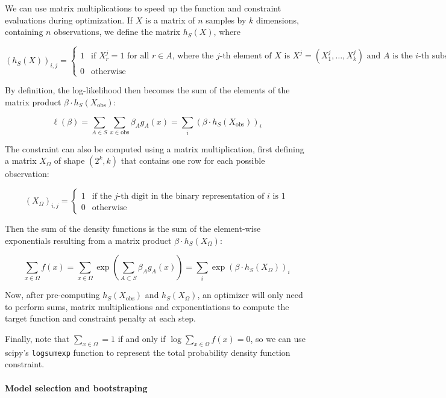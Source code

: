 We can use matrix multiplications to speed up the function and
constraint evaluations during optimization. If \(X\) is a matrix of
\(n\) samples by \(k\) dimensions, containing \(n\) observations, we
define the matrix \(h_S(X)\), where

\[ (h_S(X))_{i, j} = \begin{cases}
1 & \text{if } X_{r}^{j} = 1 \text{ for all } r \in A \text{, where the } j \text{-th element of } X \text{ is } X^{j} = (X^{j}_{1}, \dots, X^{j}_{k}) \text{ and } A \text{ is the } i \text{-th subset of } S \\
0 & \text{otherwise}
\end{cases}\]

By definition, the log-likelihood then becomes the sum of the elements
of the matrix product \(\beta \cdot h_S(X_\text{obs})\):

\[ \ell(\beta) = \sum_{A \in S} \sum_{x \in \text{obs}} \beta_A g_A(x) = \sum_{i} \left( \beta \cdot h_S(X_\text{obs}) \right)_{i} \]

The constraint can also be computed using a matrix multiplication, first
defining a matrix \(X_\Omega\) of shape \((2^{k}, k)\) that contains one
row for each possible observation:

\[ (X_\Omega)_{i, j} = \begin{cases}
1 & \text{if the } j \text{-th digit in the binary representation of } i \text{ is } 1 \\
0 & \text{otherwise}
\end{cases}\]

Then the sum of the density functions is the sum of the element-wise
exponentials resulting from a matrix product
\(\beta \cdot h_S(X_\Omega)\):

\[ \sum_{x \in \Omega} f(x) = \sum_{x \in \Omega} \exp \left(\sum_{A \subset S} \beta_A g_A(x) \right) 
= \sum_{i} \exp \left( \beta \cdot h_S(X_\Omega) \right)_{i}\]

Now, after pre-computing \(h_S(X_\text{obs})\) and \(h_S(X_\Omega)\), an
optimizer will only need to perform sums, matrix multiplications and
exponentiations to compute the target function and constraint penalty at
each step.

Finally, note that \(\sum_{x \in \Omega} = 1\) if and only if
\(\log \sum_{x \in \Omega} f(x) = 0\), so we can use scipy's
\texttt{logsumexp} function to represent the total probability density
function constraint.

\paragraph{Model selection and bootstraping}\label{model-selection-and-bootstraping}

